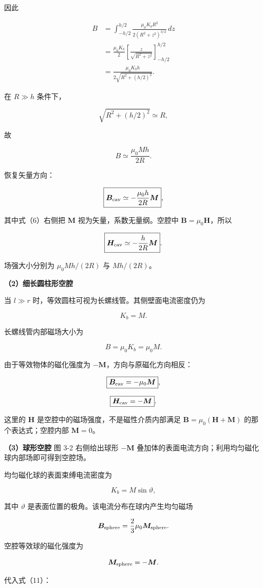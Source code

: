 \documentclass[12pt,a4paper,UTF8]{ctexart}
\begin{document}
因此

\[\begin{aligned}
B
&=\int_{-h/2}^{h/2}\frac{\mu_0K_bR^2}{2(R^2+z^2)^{3/2}}\,dz\\
&=\frac{\mu_0K_b}{2}
\left[\frac{z}{\sqrt{R^2+z^2}}\right]_{-h/2}^{h/2}\\
&=\frac{\mu_0K_bh}{2\sqrt{R^2+(h/2)^2}}.
\end{aligned}\]

在 \(R\gg h\) 条件下，

\[\sqrt{R^2+(h/2)^2}\simeq R,\]

故

\[B\simeq\frac{\mu_0Mh}{2R}.\]

恢复矢量方向：

\[\boxed{\bm B_{\rm cav}\simeq-\frac{\mu_0h}{2R}\bm M},\]

其中式（6）右侧把 \(\bm M\) 视为矢量，系数无量纲。空腔中
\(\bm B=\mu_0\bm H\)，所以

\[\boxed{\bm H_{\rm cav}\simeq-\frac{h}{2R}\bm M}.\]

场强大小分别为 \(\mu_0Mh/(2R)\) 与 \(Mh/(2R)\)。

\textbf{（2）细长圆柱形空腔}

当 \(l\gg r\) 时，等效圆柱可视为长螺线管。其侧壁面电流密度仍为

\[K_b=M.\]

长螺线管内部磁场大小为

\[B=\mu_0K_b=\mu_0M.\]

由于等效物体的磁化强度为 \(-\bm M\)，方向与原磁化方向相反：

\[\boxed{\bm B_{\rm cav}=-\mu_0\bm M},\]

\[\boxed{\bm H_{\rm cav}=-\bm M}.\]

这里的 \(\bm H\) 是空腔中的磁场强度，不是磁性介质内部满足
\(\bm B=\mu_0(\bm H+\bm M)\) 的那个表达式；空腔内部 \(\bm M=0\)。

\textbf{（3）球形空腔} 图 3-2 右侧给出球形 \(-\bm M\)
叠加体的表面电流方向；利用均匀磁化球内部场即可得到空腔场。

均匀磁化球的表面束缚电流密度为

\[K_b=M\sin\vartheta,\]

其中 \(\vartheta\) 是表面位置的极角。该电流分布在球内产生均匀磁场

\[\bm B_{\rm sphere}=\frac23\mu_0\bm M_{\rm sphere}.\]

空腔等效球的磁化强度为

\[\bm M_{\rm sphere}=-\bm M.\]

代入式（11）：
\end{document}
